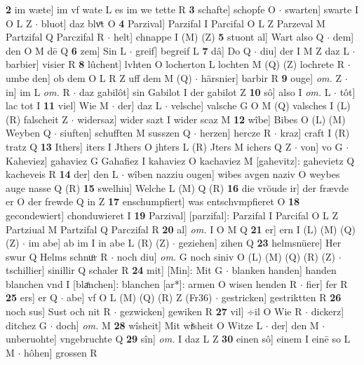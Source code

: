 \documentclass[8pt,a4paper,notitlepage]{article}
\begin{document}
\begin{table}[ht]
\begin{minipage}[t]{0.5\linewidth}
\textbf{2} im wæte] im vf wate L es im we tette R \textbf{3} schafte] schopfe O  $\cdot$ swarten] swarte I O L Z  $\cdot$ bluot] daz blvͦt O \textbf{4} Parzival] Parzifal I Parcifal O L Z Parzeval M Partzifal Q Parczifal R  $\cdot$ helt] chnappe I (M) (Z) \textbf{5} stuont al] Wart also Q  $\cdot$ dem] den O M dē Q \textbf{6} zem] Sin L  $\cdot$ greif] begreif L \textbf{7} dâ] Do Q  $\cdot$ diu] der I M Z daz L  $\cdot$ barbier] visier R \textbf{8} lûchent] lvhten O locherton L lochten M (Q) (Z) lochrete R  $\cdot$ umbe den] ob dem O L R Z uff dem M (Q)  $\cdot$ härsnier] barbir R \textbf{9} ouge] \textit{om.} Z  $\cdot$ in] im L \textit{om.} R  $\cdot$ daz gabilôt] sin Gabilot I der gabilot Z \textbf{10} sô] also I \textit{om.} L  $\cdot$ tôt] lac tot I \textbf{11} viel] Wie M  $\cdot$ der] daz L  $\cdot$ velsche] valsche G O M (Q) valsches I (L) (R) falscheit Z  $\cdot$ widersaz] wider sazt I wider scaz M \textbf{12} wîbe] Bibes O (L) (M) Weyben Q  $\cdot$ siuften] schufften M susszen Q  $\cdot$ herzen] hercze R  $\cdot$ kraz] craft I (R) tratz Q \textbf{13} Ithers] iters I Jthers O jhters L (R) Jters M ichers Q Z  $\cdot$ von] vo G  $\cdot$ Kaheviez] gahaviez G Gahafiez I kahaviez O kachaviez M [gahevitz]: gahevietz Q kacheveis R \textbf{14} der] den L  $\cdot$ wîben nazziu ougen] wibes avgen naziv O weybes auge nasse Q (R) \textbf{15} swelhiu] Welche L (M) Q (R) \textbf{16} die vröude ir] der frævde er O der frewde Q in Z \textbf{17} enschumpfiert] was entschvmpfieret O \textbf{18} gecondewiert] chonduwieret I \textbf{19} Parzival] [parzifal]: Parzifal I Parcifal O L Z Partziual M Partzifal Q Parczifal R \textbf{20} al] \textit{om.} I O M Q \textbf{21} er] ern I (L) (M) (Q) (Z)  $\cdot$ im abe] ab im I in abe L (R) (Z)  $\cdot$ geziehen] zihen Q \textbf{23} helmsnüere] Her swur Q Helms schnuͦr R  $\cdot$ noch diu] \textit{om.} G noch siniv O (L) (M) (Q) (R) (Z)  $\cdot$ tschillier] sinillir Q schaler R \textbf{24} mit] [Min]: Mit G  $\cdot$ blanken handen] handen blanchen vnd I [blaͤnchen]: blanchen [ar*]: armen O wisen henden R  $\cdot$ fier] fer R \textbf{25} ers] er Q  $\cdot$ abe] vf O L (M) (Q) (R) Z (Fr36)  $\cdot$ gestricken] gestriktten R \textbf{26} noch sus] Sust och nit R  $\cdot$ gezwicken] gewiken R \textbf{27} vil] ÷il O Wie R  $\cdot$ dickerz] ditchez G  $\cdot$ doch] \textit{om.} M \textbf{28} wîsheit] Mit wiͤsheit O Witze L  $\cdot$ der] den M  $\cdot$ unberuohte] vngebruchte Q \textbf{29} sîn] \textit{om.} I daz L Z \textbf{30} einen sô] einem I einē so L M  $\cdot$ hôhen] grossen R \newline

\end{minipage}
\end{table}
\end{document}
